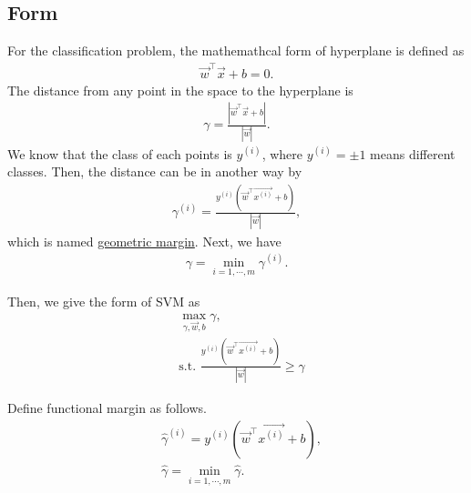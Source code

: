 \documentclass[10pt,onecolumn]{book}
\begin{document}
\subsection{Form}
For the classification problem, the mathemathcal form of hyperplane is defined as 
\begin{equation}
\begin{split}
\vec{w}^\top \vec{x} + b = 0.
\end{split}
\end{equation}
The distance from any point in the space to the hyperplane is
\begin{equation}
\begin{split}
\gamma = \frac{|\vec{w}^\top \vec{x} + b|}{|\vec{w}|}.
\end{split}
\end{equation}
We know that the class of each points is $y^{(i)}$, where $y^{(i)} = \pm 1$ means different classes. Then, the distance can be in another way by 
\begin{equation}
\begin{split}
\gamma^{(i)} = \frac{y^{(i)}(\vec{w}^\top \overrightarrow{x^{(i)}} + b)}{|\vec{w}|},
\end{split}
\end{equation}
which is named \uline{geometric margin}. Next, we have 
\begin{equation}
\begin{split}
\gamma = \min_{i=1,\cdots, m} \gamma^{(i)}.
\end{split}
\end{equation}

Then, we give the form of SVM as
\begin{equation}\label{eq:svm1}
\begin{split}
& \max_{\gamma, \vec{w}, b} \gamma, \\
& \text{s.t. } \frac{y^{(i)}(\vec{w}^\top \overrightarrow{x^{(i)}} + b)}{|\vec{w}|} \geq \gamma
\end{split}
\end{equation}

Define functional margin as follows.
\begin{equation}
\begin{split}
& \hat{\gamma}^{(i)} = y^{(i)}(\vec{w}^\top \overrightarrow{x^{(i)}} + b), \\
& \hat{\gamma} = \min_{i = 1, \cdots, m} \hat{\gamma}.
\end{split}
\end{equation}
\end{document}
